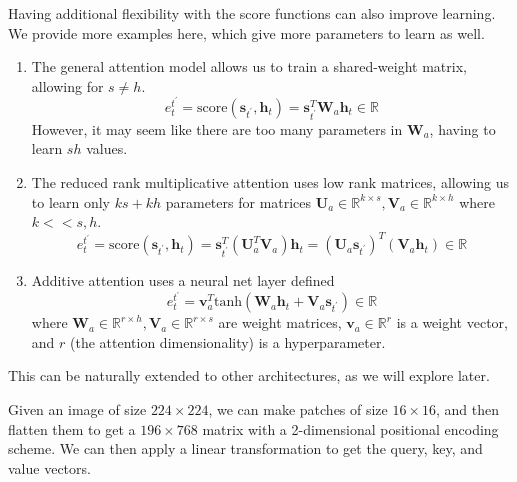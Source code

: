   \begin{example}
    Having additional flexibility with the score functions can also improve learning. We provide more examples here, which give more parameters to learn as well.  
    \begin{enumerate}
      \item The general attention model allows us to train a shared-weight matrix, allowing for $s \neq h$. 
      \[e^{t^\prime}_t = \mathrm{score}(\mathbf{s}_{t^\prime}, \mathbf{h}_t) = \mathbf{s}_{t^\prime}^T \mathbf{W}_a \mathbf{h}_t \in \mathbb{R}\]
      However, it may seem like there are too many parameters in $\mathbf{W}_a$, having to learn $sh$ values. 

      \item The reduced rank multiplicative attention uses low rank matrices, allowing us to learn only $ks + kh$ parameters for matrices $\mathbf{U}_a \in \mathbb{R}^{k \times s}, \mathbf{V}_a \in \mathbb{R}^{k \times h}$ where $k << s, h$. 
      \[e^{t^\prime}_t = \mathrm{score}(\mathbf{s}_{t^\prime}, \mathbf{h}_t) = \mathbf{s}_{t^\prime}^T (\mathbf{U}_a^T \mathbf{V}_a) \mathbf{h}_t = (\mathbf{U}_a \mathbf{s}_{t^\prime})^T (\mathbf{V}_a \mathbf{h}_t) \in \mathbb{R}\]

      \item Additive attention uses a neural net layer defined 
      \[e^{t^\prime}_t = \mathbf{v}_a^T \mathrm{tanh}(\mathbf{W}_a \mathbf{h}_t + \mathbf{V}_a \mathbf{s}_{t^\prime}) \in \mathbb{R}\]
      where $\mathbf{W}_a \in \mathbb{R}^{r \times h}, \mathbf{V}_a \in \mathbb{R}^{r \times s}$ are weight matrices, $\mathbf{v}_a \in \mathbb{R}^r$ is a weight vector, and $r$ (the attention dimensionality) is a hyperparameter. 
    \end{enumerate}
  \end{example}

  This can be naturally extended to other architectures, as we will explore later. 

  \begin{example}[Images]
    Given an image of size $224 \times 224$, we can make patches of size $16 \times 16$, and then flatten them to get a $196 \times 768$ matrix with a 2-dimensional positional encoding scheme. We can then apply a linear transformation to get the query, key, and value vectors.
  \end{example}

